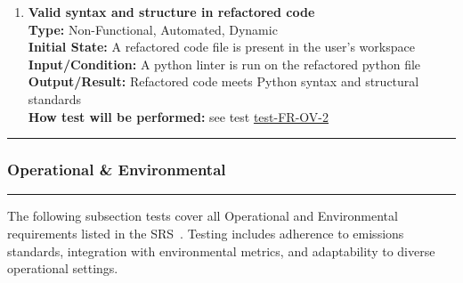 \documentclass[12pt, titlepage]{article}
\newcommand{\colorrule}{\textcolor{BlueViolet}{\rule{\linewidth}{2pt}}}
\begin{document}
\begin{enumerate}[label={\bf \textcolor{Maroon}{test-PF-\arabic*}},
      wide=0pt, font=\itshape]
    \item \textbf{Valid syntax and structure in refactored code} \\[2mm]
      \textbf{Type:} Non-Functional, Automated, Dynamic \\
      \textbf{Initial State:} A refactored code file is present in
      the user's workspace \\
      \textbf{Input/Condition:} A python linter is run on the
      refactored python file \\
      \textbf{Output/Result:} Refactored code meets Python syntax and
      structural standards \\[2mm]
      \textbf{How test will be performed:} see test
      \hyperref[itm:FR-OV-2]{test-FR-OV-2}

  \end{enumerate}

  \noindent
  \colorrule

  \subsubsection{Operational \& Environmental}
  \colorrule

  \medskip

  \noindent
  The following subsection tests cover all Operational and
  Environmental requirements listed in the SRS~\cite{SRS}. Testing
  includes adherence to emissions standards, integration with
  environmental metrics, and adaptability to diverse operational settings.
\end{document}
